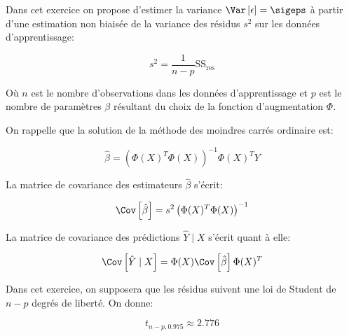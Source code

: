 \documentclass[]{../exercices}
\begin{document}
\begin{exercice}
		Dans cet exercice on propose d'estimer la variance $\Var\left[\epsilon\right] = \sigeps$ à partir d'une estimation non biaisée de la variance des résidus $s^2$ sur les données d'apprentissage:

		\begin{equation}
			s^2 = \frac{1}{n - p} \text{SS}_{\text{res}}
			\nonumber
		\end{equation}

		Où $n$ est le nombre d'observations dans les données d'apprentissage et $p$ est le nombre de paramètres $\beta$ résultant du choix de la fonction d'augmentation $\Phi$.

		On rappelle que la solution de la méthode des moindres carrés ordinaire est:

		\begin{equation}
			\hat{\beta} = \left(\Phi(X)^T \Phi(X)\right)^{-1} \Phi(X)^T Y
			\nonumber 
		\end{equation}

		La matrice de covariance des estimateurs $\hat{\beta}$ s'écrit:

		\begin{equation}
			\Cov \left[\hat{\beta}\right] = s^2 \left(\Phi(X)^T \Phi(X)\right)^{-1}
			\nonumber
		\end{equation}

		La matrice de covariance des prédictions $\hat{Y} \mid X$ s'écrit quant à elle:

		\begin{equation}
			\Cov \left[\hat{Y} \mid X \right] = \Phi(X) \Cov \left[\hat{\beta}\right] \Phi(X)^T
			\nonumber
		\end{equation}

		Dans cet exercice, on supposera que les résidus suivent une loi de Student de $n - p$ degrés de liberté. On donne:

		\begin{equation}
			t_{n-p, 0.975} \approx 2.776
			\nonumber
		\end{equation}


\end{exercice}
\end{document}
